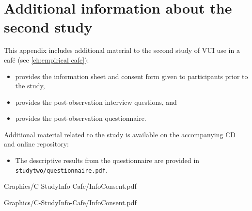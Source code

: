 


\chapter{Additional information about the second study}\label{app:studyinfo-cafe}



This appendix includes additional material to the second study of \acf{VUI} use in a caf\'e (see \autoref{ch:empirical cafe}):

\begin{itemize}
    \item {} provides the information sheet and consent form given to participants prior to the study,
    \item {} provides the post-observation interview questions, and
    \item {} provides the post-observation questionnaire.
\end{itemize}

Additional material related to the study is available on the accompanying CD and online repository:

\begin{itemize}
    \item The descriptive results from the questionnaire are provided in \texttt{studytwo/questionnaire.pdf}.
\end{itemize}







    {Graphics/C-StudyInfo-Cafe/InfoConsent.pdf}
 
    {Graphics/C-StudyInfo-Cafe/InfoConsent.pdf}



